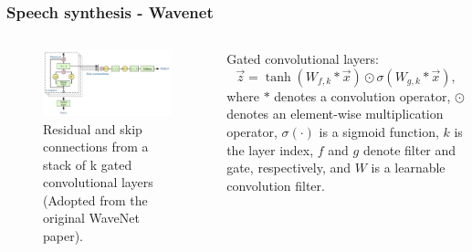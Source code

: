 \documentclass[a4paper,9pt]{beamer}
\theoremstyle{mytheoremstyle}
\begin{document}
\begin{frame}
\frametitle{Speech synthesis - Wavenet}
\begin{columns}
\begin{figure}
\begin{center}
  \includegraphics[width=\textwidth]{res/residual_blocks.png}
\end{center}
	\caption{Residual and skip connections from a stack of k gated convolutional layers (Adopted from the original WaveNet paper).}
\end{figure}
\begin{exampleblock}{}
\tiny{Gated convolutional layers:
\begin{equation}
\vec{z} = \tanh \left(W_{f, k} \ast \vec{x}\right) \odot \sigma \left(W_{g, k} \ast \vec{x} \right), \label{eq:gated_activation}
\end{equation}
where $\ast$ denotes a convolution operator, $\odot$ denotes an element-wise multiplication operator, $\sigma(\cdot)$ is a sigmoid function, $k$ is the layer index, $f$ and $g$ denote filter and gate, respectively, and $W$ is a learnable convolution filter.}
\end{exampleblock}
\end{columns}
\end{frame}
\end{document}
